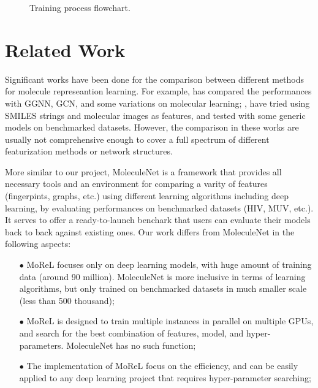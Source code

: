 \documentclass[conference]{IEEEtran}
\begin{document}
\begin{figure}[!htb] 

	\caption{\small 
		Training process flowchart. }
	\label{fig:train}
\end{figure}

\section{Related Work} \label{sec_rw}

Significant works have been done for the comparison between different methods for molecule represeantion learning. 
For example, \cite{gagcn} has compared the performances with GGNN, GCN, and some variations on molecular learning; \cite{smiles2vec}, \cite{chemception} have tried using SMILES strings and molecular images as features, and tested with some generic models on benchmarked datasets. 
However, the comparison in these works are usually not comprehensive enough to cover a full spectrum of different featurization methods or network structures. 

More similar to our project, MoleculeNet \cite{molnet} is a framework that provides all necessary tools and an environment for comparing a varity of features (fingerpints, graphs, etc.) using different learning algorithms including deep learning, by evaluating performances on benchmarked datasets (HIV, MUV, etc.). 
It serves to offer a ready-to-launch benchark that users can evaluate their models back to back against existing ones. 
Our work differs from MoleculeNet in the following aspects:
\begin{itemize}
	\item[$\bullet$]  MoReL focuses only on deep learning models, with huge amount of training data (around 90 million). MoleculeNet is more inclusive in terms of learning algorithms, but only trained on benchmarked datasets in much smaller scale (less than 500 thousand);
	\item[$\bullet$]  MoReL is designed to train multiple instances in parallel on multiple GPUs, and search for the best combination of features, model, and hyper-parameters. MoleculeNet has no such function;
	\item[$\bullet$]  The implementation of MoReL focus on the efficiency, and can be easily applied to any deep learning project that requires hyper-parameter searching; 
\end{itemize}
\end{document}
